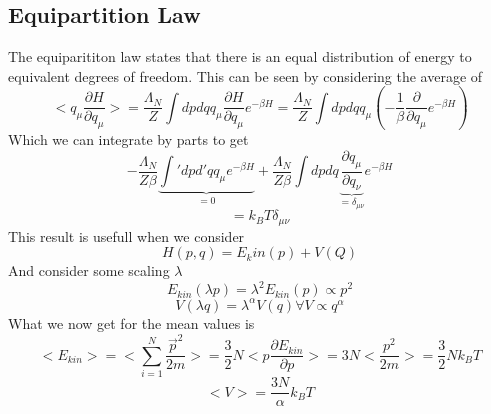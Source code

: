 \documentclass{report}
\begin{document}
\subsection{Equipartition Law}
The equiparititon law states that there is an equal distribution of energy to equivalent degrees of freedom. This can be seen by considering the average of 
\[
  <q_\mu \frac{\partial H}{\partial q_\mu}> = \frac{\Lambda_N}{Z} \int dpdq q_\mu \frac{\partial H}{\partial q_\mu} e^{-\beta H} = \frac{\Lambda_N}{Z} \int dpdq q_\mu \left( -\frac{1}{\beta} \frac{\partial }{\partial q_\mu} e^{-\beta H} \right) 
\] Which we can integrate by parts to get \[
- \frac{\Lambda_{N}}{Z \beta} \underbrace{\int' dpd'q q_\mu e^{-\beta H}}_{=0} + \frac{\Lambda_N}{Z \beta} \int dp dq \underbrace{\frac{\partial q_\mu}{\partial q_\nu }}_{= \delta_{\mu\nu}} e^{-\beta H}
\] \[
= k_B T \delta_{\mu\nu}
\] 
This result is usefull when we consider \[
  H\left( p,q \right) = E_kin \left( p \right)  + V\left( Q \right) 
\] And consider some scaling $\lambda$ \[
E_{kin}\left( \lambda p \right) = \lambda^2 E_{kin}\left( p \right) \propto p^2
\] \[
V\left( \lambda q \right) = \lambda^{\alpha} V\left( q \right) \forall V \propto q^{\alpha}
\] 
What we now get for the mean values is \[
<E_{kin}> = < \sum_{i=1}^{N} \frac{\vec{p}^2}{2m} > = \frac{3}{2} N < p \frac{\partial E_{kin} }{\partial p}> = 3N < \frac{p^2}{2m}> = \frac{3}{2} N k_B T
\] 
\[
<V> = \frac{3N}{\alpha} k_B T
\] 
\end{document}
